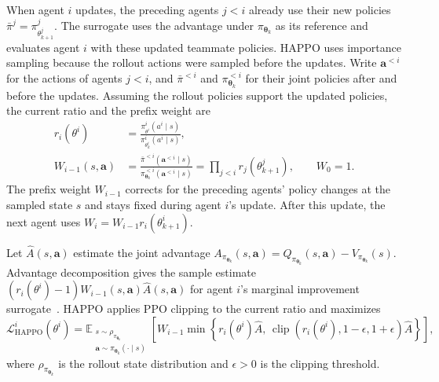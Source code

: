 \documentclass{article}
\newcommand{\E}{\mathbb{E}}
\newcommand{\clip}{\operatorname{clip}}
\begin{document}
When agent $i$ updates, the preceding agents $j<i$ already use their new policies $\bar\pi^j=\pi_{\theta_{k+1}^j}^j$. The surrogate uses the advantage under $\pi_{\boldsymbol\theta_k}$ as its reference and evaluates agent $i$ with these updated teammate policies. HAPPO uses importance sampling because the rollout actions were sampled before the updates. Write $\boldsymbol a^{<i}$ for the actions of agents $j<i$, and $\bar\pi^{<i}$ and $\pi_{\boldsymbol\theta_k}^{<i}$ for their joint policies after and before the updates. Assuming the rollout policies support the updated policies, the current ratio and the prefix weight are
\begin{equation}
    \begin{aligned}
        r_i(\theta^i)
        &= \frac{\pi_{\theta^i}^i(a^i\mid s)}
                 {\pi_{\theta_k^i}^i(a^i\mid s)}, \\
        W_{i-1}(s,\boldsymbol a)
        &= \frac{\bar\pi^{<i}(\boldsymbol a^{<i}\mid s)}
                 {\pi_{\boldsymbol\theta_k}^{<i}(\boldsymbol a^{<i}\mid s)}
         = \prod_{j<i}r_j(\theta_{k+1}^j),
        \qquad W_0=1.
    \end{aligned}
    \label{eq:happo-importance-weights}
\end{equation}
The prefix weight $W_{i-1}$ corrects for the preceding agents' policy changes at the sampled state $s$ and stays fixed during agent $i$'s update. After this update, the next agent uses $W_i=W_{i-1}r_i(\theta_{k+1}^i)$.

Let $\hat A(s,\boldsymbol a)$ estimate the joint advantage $A_{\pi_{\boldsymbol\theta_k}}(s,\boldsymbol a)=Q_{\pi_{\boldsymbol\theta_k}}(s,\boldsymbol a)-V_{\pi_{\boldsymbol\theta_k}}(s)$. Advantage decomposition gives the sample estimate $(r_i(\theta^i)-1)W_{i-1}(s,\boldsymbol a)\hat A(s,\boldsymbol a)$ for agent $i$'s marginal improvement surrogate~\citep{kuba2022}. HAPPO applies PPO clipping to the current ratio and maximizes~\citep{kuba2022,schulman2017}
\begin{equation}
    \mathcal L_{\mathrm{HAPPO}}^i(\theta^i)
    =\E_{\substack{s\sim\rho_{\pi_{\boldsymbol\theta_k}}\\
                   \boldsymbol a\sim\pi_{\boldsymbol\theta_k}(\cdot\mid s)}}\!
    \left[
      W_{i-1}\min\!\left\{
        r_i(\theta^i)\hat A,\,
        \clip(r_i(\theta^i),1-\epsilon,1+\epsilon)\hat A
      \right\}
    \right],
    \label{eq:happo-surrogate}
\end{equation}
where $\rho_{\pi_{\boldsymbol\theta_k}}$ is the rollout state distribution and $\epsilon>0$ is the clipping threshold.
\end{document}
